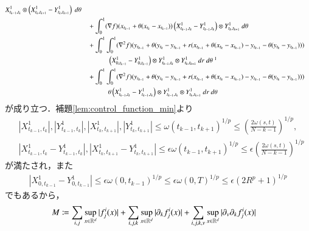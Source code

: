 \begin{prf}
\begin{description}
\begin{align}
						X^1_{t_{k-1},t_k} \otimes \left( X^1_{t_k,t_{k+1}} - Y^1_{t_k,t_{k+1}} \right)\ d\theta \\
						&\quad + \int_0^1 (\nabla f)( x_{t_{k-1}}+\theta ( x_{t_k}-x_{t_{k-1}} ))
						\left( X^1_{t_{k-1},t_k} - Y^1_{t_{k-1},t_k} \right) \otimes Y^1_{t_k,t_{k+1}}\ d\theta \\
						&\quad + \int_0^1 \int_0^1 (\nabla^2 f)( y_{t_{k-1}}+\theta ( y_{t_k}-y_{t_{k-1}} + r(x_{t_{k-1}}+\theta ( x_{t_k}-x_{t_{k-1}}) - y_{t_{k-1}}-\theta ( y_{t_k}-y_{t_{k-1}}))) \\
						&\qquad\qquad \left( X^1_{0,t_{k-1}} - Y^1_{0,t_{k-1}} \right) \otimes Y^1_{t_{k-1},t_k} \otimes Y^1_{t_k,t_{k+1}}\ dr\ d\theta\ \footnotemark \\
						&\quad + \int_0^1 \int_0^1 (\nabla^2 f)( y_{t_{k-1}}+\theta ( y_{t_k}-y_{t_{k-1}} + r(x_{t_{k-1}}+\theta ( x_{t_k}-x_{t_{k-1}}) - y_{t_{k-1}}-\theta ( y_{t_k}-y_{t_{k-1}}))) \\
						&\qquad\qquad \theta \left( X^1_{t_{k-1},t_k} - Y^1_{t_{k-1},t_k} \right) \otimes Y^1_{t_{k-1},t_k} \otimes Y^1_{t_k,t_{k+1}}\ dr\ d\theta
				\end{align}
				が成り立つ．補題\ref{lem:control_function_min}より
				\begin{align}
					&\left| X^1_{t_{k-1},t_k} \right|, \left| Y^1_{t_{k-1},t_k} \right|,\left| X^1_{t_k,t_{k+1}} \right|, \left| Y^1_{t_k,t_{k+1}} \right|
					\leq \omega(t_{k-1},t_{k+1})^{1/p} \leq \left( \frac{2\omega(s,t)}{N-k-1} \right)^{1/p}, \\
					&\left| X^1_{t_{k-1},t_k} - Y^1_{t_{k-1},t_k} \right|,\left| X^1_{t_k,t_{k+1}} - Y^1_{t_k,t_{k+1}} \right|
					\leq \epsilon \omega(t_{k-1},t_{k+1})^{1/p} \leq \epsilon \left( \frac{2\omega(s,t)}{N-k-1} \right)^{1/p}
				\end{align}
				が満たされ，また
				\begin{align}
					\left| X^1_{0,t_{k-1}} - Y^1_{0,t_{k-1}} \right|
					\leq \epsilon \omega(0,t_{k-1})^{1/p}
					\leq \epsilon \omega(0,T)^{1/p}
					\leq \epsilon \left( 2 R^p + 1 \right)^{1/p}
				\end{align}
				でもあるから，
				\begin{align}
					M &\coloneqq \sum_{i,j} \sup{x \in \R^d}{|f^i_j(x)|} + \sum_{i,j,k} \sup{x \in \R^d}{|\partial_k f^i_j(x)|}
						+ \sum_{i,j,k,v} \sup{x \in \R^d}{|\partial_v \partial_k f^i_j(x)|}
					\label{eq:continuity_theorem_1_4}

\end{align}
\end{description}
\end{prf}

